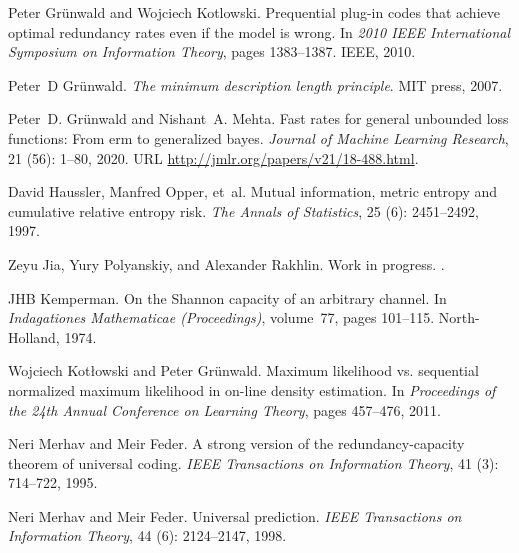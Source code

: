 \documentclass[12pt]{colt2021} %
\theoremstyle{remark}
\begin{document}
\begin{thebibliography}{32}
Peter Gr{\"u}nwald and Wojciech Kotlowski.
\newblock Prequential plug-in codes that achieve optimal redundancy rates even
  if the model is wrong.
\newblock In \emph{2010 IEEE International Symposium on Information Theory},
  pages 1383--1387. IEEE, 2010.

Peter~D Gr{\"u}nwald.
\newblock \emph{The minimum description length principle}.
\newblock MIT press, 2007.

Peter~D. Gr\"unwald and Nishant~A. Mehta.
\newblock Fast rates for general unbounded loss functions: From erm to
  generalized bayes.
\newblock \emph{Journal of Machine Learning Research}, 21
  (56): 1--80, 2020.
\newblock URL \url{http://jmlr.org/papers/v21/18-488.html}.

David Haussler, Manfred Opper, et~al.
\newblock Mutual information, metric entropy and cumulative relative entropy
  risk.
\newblock \emph{The Annals of Statistics}, 25 (6):
  2451--2492, 1997.

Zeyu Jia, Yury Polyanskiy, and Alexander Rakhlin.
\newblock Work in progress.
.

JHB Kemperman.
\newblock On the {S}hannon capacity of an arbitrary channel.
\newblock In \emph{Indagationes Mathematicae (Proceedings)}, volume~77, pages
  101--115. North-Holland, 1974.

Wojciech Kot{\l}owski and Peter Gr{\"u}nwald.
\newblock Maximum likelihood vs. sequential normalized maximum likelihood in
  on-line density estimation.
\newblock In \emph{Proceedings of the 24th Annual Conference on Learning
  Theory}, pages 457--476, 2011.

Neri Merhav and Meir Feder.
\newblock A strong version of the redundancy-capacity theorem of universal
  coding.
\newblock \emph{IEEE Transactions on Information Theory}, 41
  (3): 714--722, 1995.

Neri Merhav and Meir Feder.
\newblock Universal prediction.
\newblock \emph{IEEE Transactions on Information Theory}, 44
  (6): 2124--2147, 1998.


\end{thebibliography}
\end{document}
